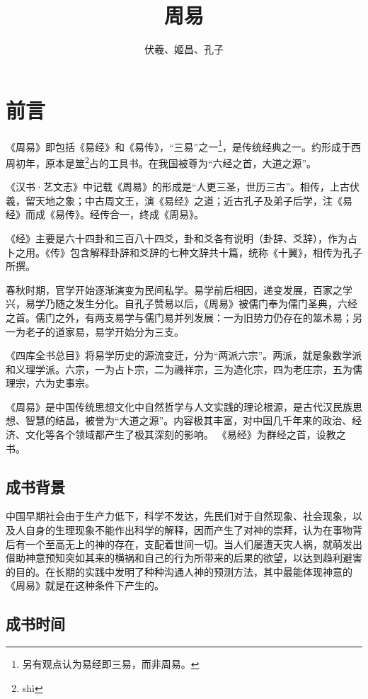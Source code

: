 \documentclass[12pt,UTF8]{ctexbook}
\title{\heiti\zihao{0} 周易}
\author{伏羲、姬昌、孔子}
\date{}
\begin{document}
\maketitle
\tableofcontents

\frontmatter
\chapter{前言}

《周易》即包括《易经》和《易传》，“三易”之一\footnote{另有观点认为易经即三易，而非周易。}，是传统经典之一。约形成于西周初年，原本是筮\footnote{sh\`{i}}占的工具书。在我国被尊为“六经之首，大道之源”。

《汉书·艺文志》中记载《周易》的形成是“人更三圣，世历三古”。相传，上古伏羲，留天地之象；中古周文王，演《易经》之道；近古孔子及弟子后学，注《易经》而成《易传》。经传合一，终成《周易》。

《经》主要是六十四卦和三百八十四爻，卦和爻各有说明（卦辞、爻辞），作为占卜之用。《传》包含解释卦辞和爻辞的七种文辞共十篇，统称《十翼》，相传为孔子所撰。

春秋时期，官学开始逐渐演变为民间私学。易学前后相因，递变发展，百家之学兴，易学乃随之发生分化。自孔子赞易以后，《周易》被儒门奉为儒门圣典，六经之首。儒门之外，有两支易学与儒门易并列发展：一为旧势力仍存在的筮术易；另一为老子的道家易，易学开始分为三支。

《四库全书总目》将易学历史的源流变迁，分为“两派六宗”。两派，就是象数学派和义理学派。六宗，一为占卜宗，二为禨祥宗，三为造化宗，四为老庄宗，五为儒理宗，六为史事宗。

《周易》是中国传统思想文化中自然哲学与人文实践的理论根源，是古代汉民族思想、智慧的结晶，被誉为“大道之源”。内容极其丰富，对中国几千年来的政治、经济、文化等各个领域都产生了极其深刻的影响。
《易经》为群经之首，设教之书。

\section{成书背景}

中国早期社会由于生产力低下，科学不发达，先民们对于自然现象、社会现象，以及人自身的生理现象不能作出科学的解释，因而产生了对神的崇拜，认为在事物背后有一个至高无上的神的存在，支配着世间一切。当人们屡遭天灾人祸，就萌发出借助神意预知突如其来的横祸和自己的行为所带来的后果的欲望，以达到趋利避害的目的。在长期的实践中发明了种种沟通人神的预测方法，其中最能体现神意的《周易》就是在这种条件下产生的。

\section{成书时间}
\end{document}
